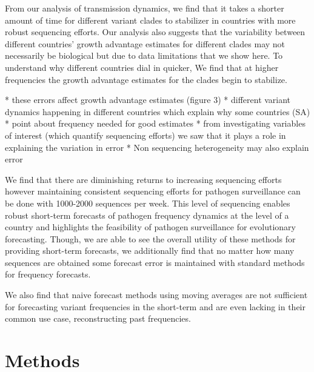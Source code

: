 \documentclass[11pt,oneside,letterpaper]{article}
\begin{document}

From our analysis of transmission dynamics, we find that it takes a shorter amount of time for different variant clades to stabilizer in countries with more robust sequencing efforts. 
Our analysis also suggests that the variability between different countries' growth advantage estimates for different clades may not necessarily be biological but due to data limitations that we show here.
To understand why different countries dial in quicker, We find that at higher frequencies the growth advantage estimates for the clades begin to stabilize. 

* these errors affect growth advantage estimates  (figure 3)
* different variant dynamics happening in different countries which explain why some countries (SA)
* point about frequency needed for good estimates
* from investigating variables of interest (which quantify sequencing efforts) we saw that it plays a role in explaining the variation in error
* Non sequencing heterogeneity may also explain error

We find that there are diminishing returns to increasing sequencing efforts however maintaining consistent sequencing efforts for pathogen surveillance can be done with 1000-2000 sequences per week. 
This level of sequencing enables robust short-term forecasts of pathogen frequency dynamics at the level of a country and highlights the feasibility of pathogen surveillance for evolutionary forecasting.
Though, we are able to see the overall utility of these methods for providing short-term forecasts, we additionally find that no matter how many sequences are obtained some forecast error is maintained with standard methods for frequency forecasts. 

We also find that naive forecast methods using moving averages are not sufficient for forecasting variant frequencies in the short-term and are even lacking in their common use case, reconstructing past frequencies.




\section*{Methods}
\end{document}
